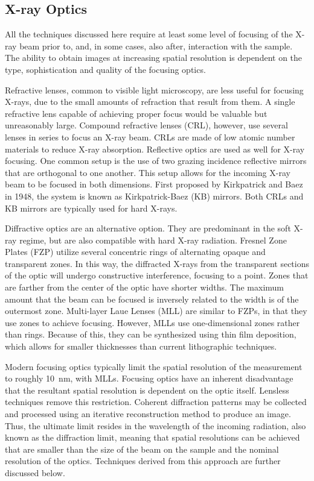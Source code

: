 \documentclass[journal=cmatex,manuscript=perspective]{achemso}
\begin{document}
\subsection{X-ray Optics}

All the techniques discussed here require at least some level of
focusing of the X-ray beam prior to, and, in some cases, also after,
interaction with the sample. The ability to obtain images at
increasing spatial resolution is dependent on the type, sophistication
and quality of the focusing optics.

Refractive lenses, common to visible light microscopy, are less useful
for focusing X-rays, due to the small amounts of refraction that
result from them. A single refractive lens capable of achieving proper
focus would be valuable but unreasonably large. Compound refractive
lenses (CRL), however, use several lenses in series to focus an X-ray
beam. CRLs are made of low atomic number materials to reduce X-ray
absorption\cite{lengeler1996}. Reflective
optics are used as well for X-ray focusing. One common setup is the
use of two grazing incidence reflective mirrors that are orthogonal to
one another. This setup allows for the incoming X-ray beam to be
focused in both dimensions. First proposed by Kirkpatrick and Baez in
1948, the system is known as Kirkpatrick-Baez (KB) mirrors. Both CRLs
and KB mirrors are typically used for hard X-rays\cite{kirkpatrick1948}.

Diffractive optics are an alternative option. They are predominant in
the soft X-ray regime, but are also compatible with hard X-ray
radiation. Fresnel Zone Plates (FZP) utilize several concentric rings
of alternating opaque and transparent zones. In this way, the
diffracted X-rays from the transparent sections of the optic will
undergo constructive interference, focusing to a point. Zones that are
farther from the center of the optic have shorter widths. The maximum
amount that the beam can be focused is inversely related to the width
is of the outermost zone. Multi-layer Laue Lenses (MLL) are similar to
FZPs, in that they use zones to achieve focusing. However, MLLs use
one-dimensional zones rather than rings. Because of this, they can be
synthesized using thin film deposition, which allows for smaller
thicknesses than current lithographic
techniques\cite{synchrotronradiation,lblzoneplate}.

Modern focusing optics typically limit the spatial resolution of the
measurement to roughly \SI{10}{nm}, with MLLs\cite{yan2014}. Focusing
optics have an inherent disadvantage that the resultant spatial
resolution is dependent on the optic itself. Lensless techniques
remove this restriction. Coherent diffraction patterns may be
collected and processed using an iterative reconstruction method to
produce an image. Thus, the ultimate limit resides in the wavelength
of the incoming radiation, also known as the diffraction limit,
meaning that spatial resolutions can be achieved that are smaller than
the size of the beam on the sample and the nominal resolution of the
optics. Techniques derived from this approach are further discussed
below.
\end{document}
